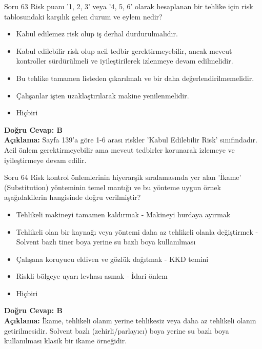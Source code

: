 \documentclass[12pt,a4paper]{article}
\begin{document}
\begin{testcard}{Soru 63}
    Risk puanı '1, 2, 3' veya '4, 5, 6' olarak hesaplanan bir tehlike için risk tablosundaki karşılık gelen durum ve eylem nedir?
    \begin{itemize}
        \item[A)] Kabul edilemez risk olup iş derhal durdurulmalıdır.
        \item[B)] Kabul edilebilir risk olup acil tedbir gerektirmeyebilir, ancak mevcut kontroller sürdürülmeli ve iyileştirilerek izlenmeye devam edilmelidir.
        \item[C)] Bu tehlike tamamen listeden çıkarılmalı ve bir daha değerlendirilmemelidir.
        \item[D)] Çalışanlar işten uzaklaştırılarak makine yenilenmelidir.
        \item[E)] Hiçbiri
    \end{itemize}
    \tcblower
    \textbf{Doğru Cevap: B} \\
    \textbf{Açıklama:} Sayfa 139'a göre 1-6 arası riskler 'Kabul Edilebilir Risk' sınıfındadır. Acil önlem gerektirmeyebilir ama mevcut tedbirler korunarak izlemeye ve iyileştirmeye devam edilir.
\end{testcard}

\begin{testcard}{Soru 64}
    Risk kontrol önlemlerinin hiyerarşik sıralamasında yer alan 'İkame' (Substitution) yönteminin temel mantığı ve bu yönteme uygun örnek aşağıdakilerin hangisinde doğru verilmiştir?
    \begin{itemize}
        \item[A)] Tehlikeli makineyi tamamen kaldırmak - Makineyi hurdaya ayırmak
        \item[B)] Tehlikeli olan bir kaynağı veya yöntemi daha az tehlikeli olanla değiştirmek - Solvent bazlı tiner boya yerine su bazlı boya kullanılması
        \item[C)] Çalışana koruyucu eldiven ve gözlük dağıtmak - KKD temini
        \item[D)] Riskli bölgeye uyarı levhası asmak - İdari önlem
        \item[E)] Hiçbiri
    \end{itemize}
    \tcblower
    \textbf{Doğru Cevap: B} \\
    \textbf{Açıklama:} İkame, tehlikeli olanın yerine tehlikesiz veya daha az tehlikeli olanın getirilmesidir. Solvent bazlı (zehirli/parlayıcı) boya yerine su bazlı boya kullanılması klasik bir ikame örneğidir.
\end{testcard}
\end{document}
